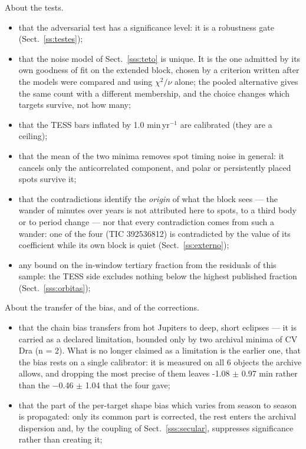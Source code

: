 \documentclass{aa}
\begin{document}
About the tests.

\begin{itemize}
\item that the adversarial test has a significance level: it is a robustness gate (Sect.~\ref{ss:testes});
\item that the noise model of Sect.~\ref{sss:teto} is unique. It is the one admitted by its own goodness of fit on the extended block, chosen by a criterion written after the models were compared and using $\chi^2/\nu$ alone; the pooled alternative gives the same count with a different membership, and the choice changes which targets survive, not how many;
\item that the TESS bars inflated by 1.0 min\,yr$^{-1}$ are calibrated (they are a ceiling);
\item that the mean of the two minima removes spot timing noise in general: it cancels only the anticorrelated component, and polar or persistently placed spots survive it;
\item that the contradictions identify the \textit{origin} of what the block sees --- the wander of minutes over years is not attributed here to spots, to a third body or to period change --- nor that every contradiction comes from such a wander: one of the four (TIC 392536812) is contradicted by the value of its coefficient while its own block is quiet (Sect.~\ref{ss:externo});
\item any bound on the in-window tertiary fraction from the residuals of this sample: the TESS side excludes nothing below the highest published fraction (Sect.~\ref{sss:orbitas});
\end{itemize}

About the transfer of the bias, and of the corrections.

\begin{itemize}
\item that the chain bias transfers from hot Jupiters to deep, short eclipses --- it is carried as a declared limitation, bounded only by two archival minima of CV Dra (n = 2). What is no longer claimed as a limitation is the earlier one, that the bias rests on a single calibrator: it is measured on all 6 objects the archive allows, and dropping the most precise of them leaves -1.08 $\pm$ 0.97 min rather than the $-$0.46 $\pm$ 1.04 that the four gave;
\item that the part of the per-target shape bias which varies from season to season is propagated: only its common part is corrected, the rest enters the archival dispersion and, by the coupling of Sect.~\ref{sss:secular}, suppresses significance rather than creating it;
\end{itemize}
\end{document}
